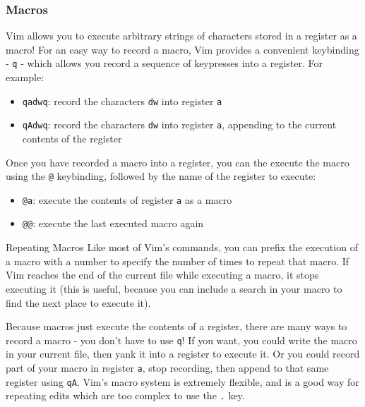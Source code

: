 \documentclass{beamer}
\begin{document}
\begin{frame}[fragile]
    \frametitle{Macros}
    \small
    Vim allows you to execute arbitrary strings of characters stored in a register as a macro! For an easy way to record a macro, Vim provides a convenient keybinding - \verb+q+ - which allows you record a sequence of keypresses into a register. For example:
    \begin{itemize}
	\item \verb+qadwq+: record the characters \verb+dw+ into register \verb+a+
	\item \verb+qAdwq+: record the characters \verb+dw+ into register \verb+a+, appending to the current contents of the register
    \end{itemize}
    \vspace{0.5cm}
    Once you have recorded a macro into a register, you can the execute the macro using the \verb+@+ keybinding, followed by the name of the register to execute:
    \begin{itemize}
	\item \verb+@a+: execute the contents of register \verb+a+ as a macro
	\item \verb+@@+: execute the last executed macro again
    \end{itemize}
\end{frame}

\begin{frame}[fragile]
    \small
    \begin{block}{Repeating Macros}
	Like most of Vim's commands, you can prefix the execution of a macro with a number to specify the number of times to repeat that macro. If Vim reaches the end of the current file while executing a macro, it stops executing it (this is useful, because you can include a search in your macro to find the next place to execute it).
    \end{block}
    \vspace{0.5cm}
    Because macros just execute the contents of a register, there are many ways to record a macro - you don't have to use \verb+q+! If you want, you could write the macro in your current file, then yank it into a register to execute it. Or you could record part of your macro in register \verb+a+, stop recording, then append to that same register using \verb+qA+. Vim's macro system is extremely flexible, and is a good way for repeating edits which are too complex to use the \verb+.+ key.
\end{frame}
\end{document}
